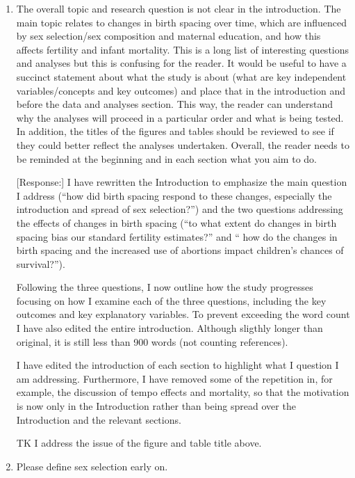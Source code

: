 \documentclass[letterpaper,12pt]{article}
\begin{document}
\begin{enumerate}

\item The overall topic and research question is not clear in the
introduction. The main topic relates to changes in birth spacing over
time, which are influenced by sex selection/sex composition and maternal
education, and how this affects fertility and infant mortality. This is
a long list of interesting questions and analyses but this is confusing
for the reader. It would be useful to have a succinct statement about
what the study is about (what are key independent variables/concepts and
key outcomes) and place that in the introduction and before the data and
analyses section. This way, the reader can understand why the analyses
will proceed in a particular order and what is being tested. In
addition, the titles of the figures and tables should be reviewed to see
if they could better reflect the analyses undertaken. Overall, the
reader needs to be reminded at the beginning and in each section what
you aim to do.

[Response:] I have rewritten the Introduction to emphasize the main question I address
(``how did birth spacing respond to these changes, especially the introduction and spread 
of sex selection?'') and the two questions addressing the effects of changes in 
birth spacing (``to what extent do changes in birth spacing bias our standard fertility 
estimates?'' and `` how do the changes in birth spacing and the increased use of abortions 
impact children's chances of survival?'').

Following the three questions, I now outline how the study progresses focusing on 
how I examine each of the three questions, including the key outcomes and key explanatory 
variables.
To prevent exceeding the word count I have also edited the entire introduction.
Although sligthly longer than original, it is still less than 900 words 
(not counting references).

I have edited the introduction of each section to highlight what I question
I am addressing.
Furthermore, I have removed some of the repetition in, for example, the
discussion of tempo effects and mortality, so that the motivation is now only
in the Introduction rather than being spread over the Introduction and the
relevant sections.

TK I address the issue of the figure and table title above.



\item Please define sex selection early on.


\end{enumerate}
\end{document}
